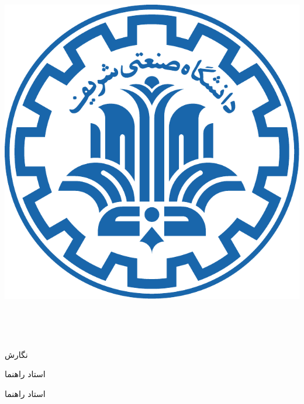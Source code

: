 

\begin{center}

\includegraphics[scale=0.25]{front/template/images/logo}

\vspace{-0.2cm}
\ThesisUniversity \\[-0.3em]
\ThesisDepartment

\begin{large}
\vspace{0.5cm}

\ThesisType \ \ThesisDegree \\[-0.3em]
\ThesisMajor

\end{large}

\vspace{2cm}

{\LARGE\textbf{\ThesisTitle}}

\vspace{2.5cm}

{نگارش}\\[.5em]
{\large\textbf{\ThesisAuthor}}

\vspace{0.7cm}

{استاد راهنما}\\[.5em]
{\large\textbf{\ThesisSupervisor}}

\vspace{0.7cm}

{استاد راهنما}\\[.5em]
{\large\textbf{\SecondSupervisor}}

\vspace{1.3cm}

\ThesisDate

\thispagestyle{empty} %
\end{center}

